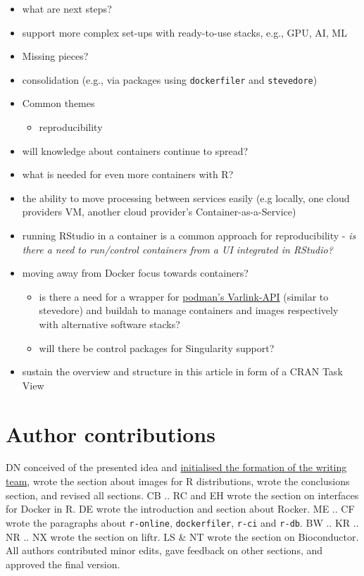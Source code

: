 \begin{itemize}
\tightlist
\item
  what are next steps?
\item
  support more complex set-ups with ready-to-use stacks, e.g., GPU, AI,
  ML
\item
  Missing pieces?
\item
  consolidation (e.g., via packages using \texttt{dockerfiler} and
  \texttt{stevedore})
\item
  Common themes

  \begin{itemize}
  \tightlist
  \item
    reproducibility
  \end{itemize}
\item
  will knowledge about containers continue to spread?
\item
  what is needed for even more containers with R?
\item
  the ability to move processing between services easily (e.g locally,
  one cloud providers VM, another cloud provider's
  Container-as-a-Service)
\item
  running RStudio in a container is a common approach for
  reproducibility - \emph{is there a need to run/control containers from
  a UI integrated in RStudio?}
\item
  moving away from Docker focus towards containers?

  \begin{itemize}
  \tightlist
  \item
    is there a need for a wrapper for
    \href{https://github.com/containers/libpod/blob/master/API.md}{podman's
    Varlink-API} (similar to stevedore) and buildah to manage containers
    and images respectively with alternative software stacks?
  \item
    will there be control packages for Singularity support?
  \end{itemize}
\item
  sustain the overview and structure in this article in form of a CRAN
  Task View
\end{itemize}

\hypertarget{author-contributions}{%
\section{Author contributions}\label{author-contributions}}

DN conceived of the presented idea and
\href{https://github.com/nuest/rockerverse-paper/issues/3}{initialised the formation of the writing team},
wrote the section about images for R distributions, wrote the
conclusions section, and revised all sections. CB .. RC and EH wrote the
section on interfaces for Docker in R. DE wrote the introduction and
section about Rocker. ME .. CF wrote the paragraphs about
\texttt{r-online}, \texttt{dockerfiler}, \texttt{r-ci} and
\texttt{r-db}. BW .. KR .. NR .. NX wrote the section on liftr. LS \& NT
wrote the section on Bioconductor. All authors contributed minor edits,
gave feedback on other sections, and approved the final version.

